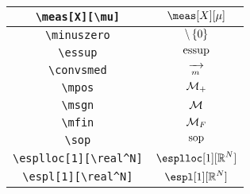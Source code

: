 \begin{longtable}{|c|c|}
\verb|\meas[X][\mu]| & $\displaystyle\meas[X][\mu]$ \\ \hline 
\verb|\minuszero| & $\displaystyle\setminus\set{0}$ \\ \hline 
\verb|\essup| & $\displaystyle\operatorname*{essup}$ \\ \hline 
\verb|\convsmed| & $\displaystyle\xrightarrow[m]{}$ \\ \hline 
\verb|\mpos| & $\displaystyle\mathcal{M}_{+}$ \\ \hline 
\verb|\msgn| & $\displaystyle\mathcal{M}$ \\ \hline 
\verb|\mfin| & $\displaystyle\mathcal{M}_{F}$ \\ \hline 
\verb|\sop| & $\displaystyle\operatorname{sop}$ \\ \hline 
\verb|\esplloc[1][\real^N]| & $\displaystyle\esplloc[1][\real^N]$ \\ \hline 
\verb|\espl[1][\real^N]| & $\displaystyle\espl[1][\real^N]$ \\ \hline 
\end{longtable}